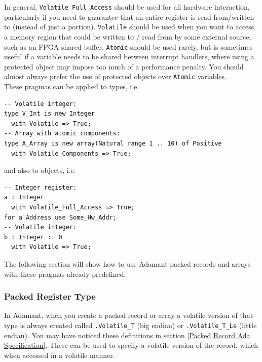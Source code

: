 In general, \texttt{Volatile\_Full\_Access} should be used for all hardware interaction, particularly if you need to guarantee that an entire register is read from/written to (instead of just a portion). \texttt{Volatile} should be used when you want to access a memory region that could be written to / read from by some external source, such as an FPGA shared buffer. \texttt{Atomic} should be used rarely, but is sometimes useful if a variable needs to be shared between interrupt handlers, where using a protected object may impose too much of a performance penalty. You should almost always prefer the use of protected objects over \texttt{Atomic} variables. \\

These pragmas can be applied to types, i.e.

\vspace{5mm} %
\begin{verbatim}
-- Volatile integer:
type V_Int is new Integer 
  with Volatile => True;
-- Array with atomic components:
type A_Array is new array(Natural range 1 .. 10) of Positive 
  with Volatile_Components => True;
\end{verbatim}
\vspace{5mm} %

and also to objects, i.e.

\vspace{5mm} %
\begin{verbatim}
-- Integer register:
a : Integer 
  with Volatile_Full_Access => True;
for a'Address use Some_Hw_Addr;
-- Volatile integer:
b : Integer := 0 
  with Volatile => True;
\end{verbatim}
\vspace{5mm} %

The following section will show how to use Adamant packed records and arrays with these pragmas already predefined.

\subsubsection{Packed Register Type}

In Adamant, when you create a packed record or array a volatile version of that type is always created called \texttt{.Volatile\_T} (big endian) or \texttt{.Volatile\_T\_Le} (little endian). You may have noticed these definitions in section \ref{Packed Record Ada Specification}. These can be used to specify a volatile version of the record, which when accessed in a volatile manner. \\

